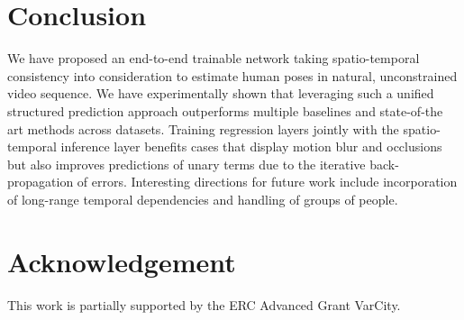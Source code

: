 \documentclass[10pt,twocolumn,letterpaper]{article}
\begin{document}
\section{Conclusion}\label{sec:conclusion}
We have proposed an end-to-end trainable network taking spatio-temporal consistency into consideration to estimate human poses in natural, unconstrained video sequence. We have experimentally shown that leveraging such a unified structured prediction approach outperforms multiple baselines and state-of-the art methods across datasets. Training regression layers jointly with the spatio-temporal inference layer benefits cases that display motion blur and occlusions but also improves predictions of unary terms due to the iterative back-propagation of errors. Interesting directions for future work include incorporation of long-range temporal dependencies and handling of groups of people.

\section*{Acknowledgement}
This work is partially supported by the ERC Advanced Grant VarCity.





{\small


}
\end{document}
